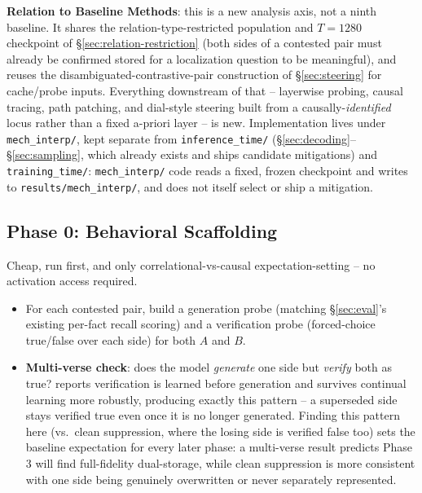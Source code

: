\documentclass[11pt]{article}
\begin{document}
\textbf{Relation to Baseline Methods}: this is a new analysis axis, not a
ninth baseline. It shares the relation-type-restricted population and
$T{=}1280$ checkpoint of \S\ref{sec:relation-restriction} (both sides of a
contested pair must already be confirmed stored for a localization question
to be meaningful), and reuses the disambiguated-contrastive-pair construction
of \S\ref{sec:steering} for cache/probe inputs. Everything downstream of that
-- layerwise probing, causal tracing, path patching, and dial-style steering
built from a causally-\emph{identified} locus rather than a fixed a-priori
layer -- is new. Implementation lives under \texttt{mech\_interp/}, kept
separate from \texttt{inference\_time/} (\S\ref{sec:decoding}--\S\ref{sec:sampling},
which already exists and ships candidate mitigations) and
\texttt{training\_time/}: \texttt{mech\_interp/} code reads a fixed, frozen
checkpoint and writes to \texttt{results/mech\_interp/}, and does not itself
select or ship a mitigation.

\subsection{Phase 0: Behavioral Scaffolding}
\label{sec:mechinterp-scaffolding}

Cheap, run first, and only correlational-vs-causal expectation-setting -- no
activation access required.

\begin{itemize}
  \item For each contested pair, build a generation probe (matching
    \S\ref{sec:eval}'s existing per-fact recall scoring) and a verification
    probe (forced-choice true/false over each side) for both $A$ and $B$.
  \item \textbf{Multi-verse check}: does the model \emph{generate} one side
    but \emph{verify} both as true? \citet{davidson2026futureoffacts} reports
    verification is learned before generation and survives continual
    learning more robustly, producing exactly this pattern -- a superseded
    side stays verified true even once it is no longer generated. Finding
    this pattern here (vs.\ clean suppression, where the losing side is
    verified false too) sets the baseline expectation for every later phase:
    a multi-verse result predicts Phase 3 will find full-fidelity
    dual-storage, while clean suppression is more consistent with one side
    being genuinely overwritten or never separately represented.
\end{itemize}
\end{document}
